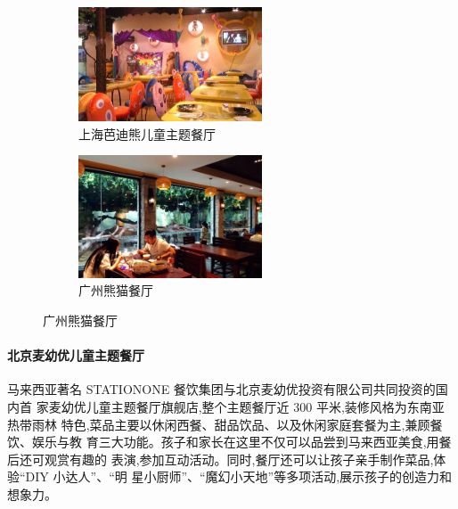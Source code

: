 \begin{figure}[htbp]
        \begin{subfigure}[b]{0.5\textwidth}
                \caption{上海芭迪熊儿童主题餐厅}
                \centering
                \includegraphics[width=0.6\textwidth]{../images/competitors/上海芭迪熊儿童主题餐厅}
        \end{subfigure}%
%
        \begin{subfigure}[b]{0.5\textwidth}
                \caption{广州熊猫餐厅}
                \centering
                \includegraphics[width=0.6\textwidth]{../images/competitors/广州熊猫餐厅}
        \end{subfigure}%
\end{figure}

\paragraph{北京麦幼优儿童主题餐厅}
马来西亚著名 STATIONONE 餐饮集团与北京麦幼优投资有限公司共同投资的国内首
家麦幼优儿童主题餐厅旗舰店,整个主题餐厅近 300 平米,装修风格为东南亚热带雨林
特色,菜品主要以休闲西餐、甜品饮品、以及休闲家庭套餐为主,兼顾餐饮、娱乐与教
育三大功能。孩子和家长在这里不仅可以品尝到马来西亚美食,用餐后还可观赏有趣的
表演,参加互动活动。同时,餐厅还可以让孩子亲手制作菜品,体验“DIY 小达人”、“明
星小厨师”、“魔幻小天地”等多项活动,展示孩子的创造力和想象力。

